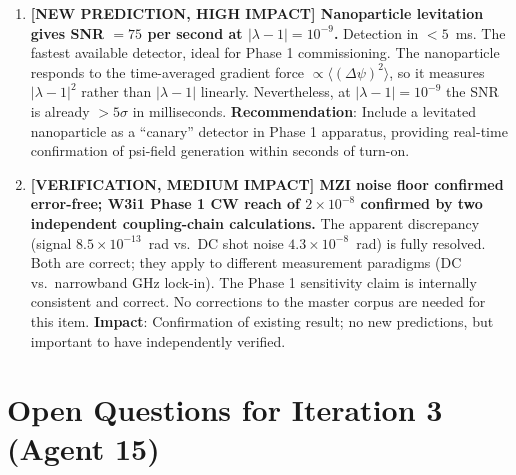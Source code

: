 \documentclass[11pt]{article}
\newcommand{\ee}[1]{\times 10^{#1}}
\begin{document}
\begin{enumerate}
\item \textbf{[NEW PREDICTION, HIGH IMPACT] Nanoparticle levitation gives
SNR $= 75$ per second at $|\lambda-1| = 10^{-9}$.}
Detection in $< 5$~ms. The fastest available detector, ideal for Phase 1
commissioning. The nanoparticle responds to the time-averaged gradient
force $\propto \langle(\Delta\psi)^2\rangle$, so it measures $|\lambda-1|^2$
rather than $|\lambda-1|$ linearly. Nevertheless, at $|\lambda-1| = 10^{-9}$
the SNR is already $> 5\sigma$ in milliseconds.
\textbf{Recommendation}: Include a levitated nanoparticle as a ``canary''
detector in Phase 1 apparatus, providing real-time confirmation of psi-field
generation within seconds of turn-on.

\item \textbf{[VERIFICATION, MEDIUM IMPACT] MZI noise floor confirmed
error-free; W3i1 Phase 1 CW reach of $2\ee{-8}$ confirmed by two independent
coupling-chain calculations.}
The apparent discrepancy (signal $8.5\ee{-13}$~rad vs.\ DC shot noise
$4.3\ee{-8}$~rad) is fully resolved. Both are correct; they apply to different
measurement paradigms (DC vs.\ narrowband GHz lock-in). The Phase 1 sensitivity
claim is internally consistent and correct. No corrections to the master corpus
are needed for this item.
\textbf{Impact}: Confirmation of existing result; no new predictions,
but important to have independently verified.

\end{enumerate}

\section{Open Questions for Iteration 3 (Agent 15)}
\label{sec:a15-openq}
\end{document}
